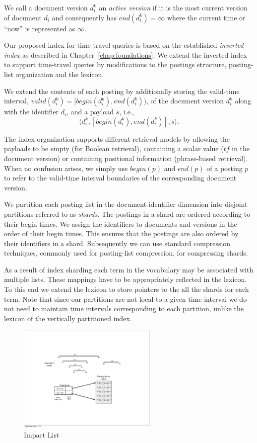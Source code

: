 We call a document version $d_i^k$ an \emph{active version} if it is the most current version of document $d_i$ and consequently has $end(d_i^k) = \infty$ where the current time or ``now'' is represented as $\infty$. 

Our proposed index for time-travel queries is based on the
established \emph{inverted index} as described in Chapter~\ref{chap:foundations}. We extend the inverted index to support 
time-travel queries by modifications to the postings structure, 
posting-list organization and the lexicon. 


We extend the contents of each posting by additionally storing the valid-time 
interval, $valid(d_i^k) = [begin(d_i^k), end(d_i^k))$, of the document version $d_i^{k}$
along with the identifier $d_i$, and a payload $s$, i.e.,
$$\langle d_i^k, [ begin(d_i^k), end(d_i^k)], s\rangle.$$

The index organization supports different retrieval models by allowing the
payloads to be empty (for Boolean retrieval), containing a scalar value ($tf$ in the document
version) or containing positional information (phrase-based retrieval). When no confusion
arises, we simply use $begin(p)$ and $end(p)$ of a posting $p$ to
refer to the valid-time interval boundaries of the corresponding document version.

We partition each posting list in the document-identifier dimension into disjoint 
partitions referred to as \emph{shards}. The postings in a shard are ordered 
according to their begin times. We assign the identifiers to documents
and versions in the order of their begin times. This ensures that the postings are also
 ordered by their identifiers in a shard. Subsequently we can use standard compression 
  techniques, commonly used for posting-list compression, for compressing shards. 

As a result of index sharding each term in the vocabulary may be associated
with multiple lists. These mappings have to be appropriately reflected in the lexicon. 
To this end we extend the lexicon to store pointers 
to the all the shards for each term. Note that since our partitions are not local to a given time interval we 
do not need to maintain time intervals corresponding to each partition, 
unlike the lexicon of the vertically partitioned index.


\begin{figure}[tb]
	\centering
		\includegraphics[width=0.6\textwidth]{resources/impact-list.pdf}
	\caption{Impact List}
	 \label{fig:impactlist}
\end{figure}


